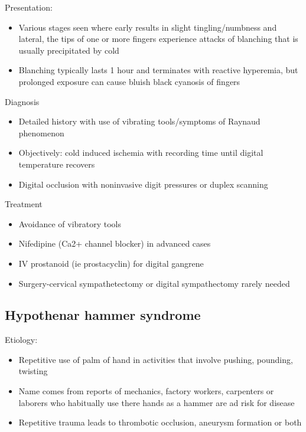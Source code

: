 \documentclass[
]{book}
\begin{document}
Presentation:

\begin{itemize}
\item
  Various stages seen where early results in slight tingling/numbness
  and lateral, the tips of one or more fingers experience attacks of
  blanching that is usually precipitated by cold~
\item
  Blanching typically lasts 1 hour and terminates with reactive
  hyperemia, but prolonged exposure can cause bluish black cyanosis of
  fingers~
\end{itemize}

Diagnosis~

\begin{itemize}
\item
  Detailed history with use of vibrating tools/symptoms of Raynaud
  phenomenon~
\item
  Objectively: cold induced ischemia with recording time until digital
  temperature recovers
\item
  Digital occlusion with noninvasive digit pressures or duplex
  scanning
\end{itemize}

Treatment

\begin{itemize}
\item
  Avoidance of vibratory tools
\item
  Nifedipine (Ca2+ channel blocker) in advanced cases~
\item
  IV prostanoid (ie prostacyclin) for digital gangrene~
\item
  Surgery-cervical sympathetectomy or digital sympathectomy rarely
  needed\\
\end{itemize}

\hypertarget{hypothenar-hammer-syndrome}{%
\subsection{Hypothenar hammer syndrome}\label{hypothenar-hammer-syndrome}}

Etiology:~

\begin{itemize}
\item
  Repetitive use of palm of hand in activities that involve pushing,
  pounding, twisting
\item
  Name comes from reports of mechanics, factory workers, carpenters or
  laborers who habitually use there hands as a hammer are ad risk for
  disease~
\item
  Repetitive trauma leads to thrombotic occlusion, aneurysm formation
  or both
\end{itemize}
\end{document}
